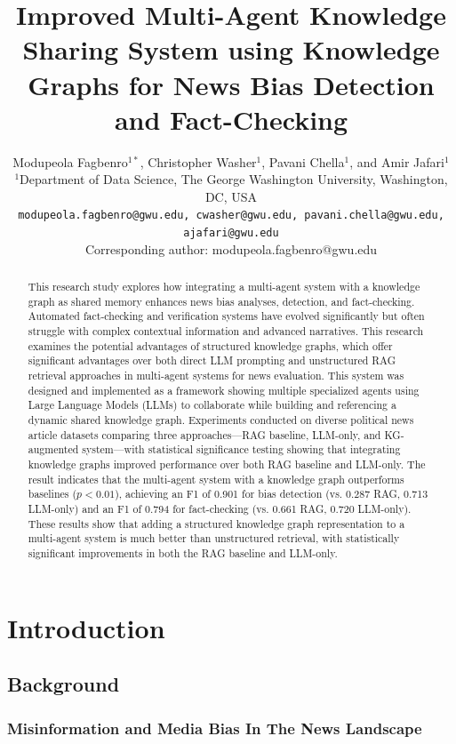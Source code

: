 \documentclass[11pt]{article}
\title{Improved Multi-Agent Knowledge Sharing System using Knowledge Graphs for News Bias Detection and Fact-Checking}
\author{Modupeola Fagbenro$^{1*}$, Christopher Washer$^{1}$, Pavani Chella$^{1}$, and Amir Jafari$^{1}$\\
\small $^{1}$Department of Data Science, The George Washington University, Washington, DC, USA\\
\small \texttt{modupeola.fagbenro@gwu.edu, cwasher@gwu.edu, pavani.chella@gwu.edu, ajafari@gwu.edu}\\
\small * Corresponding author: modupeola.fagbenro@gwu.edu
}
\date{} %
\begin{document}
\maketitle

\begin{abstract}

This research study explores how integrating a multi-agent system with a knowledge graph as shared memory enhances news bias analyses, detection, and fact-checking. Automated fact-checking and verification systems have evolved significantly but often struggle with complex contextual information and advanced narratives. This research examines the potential advantages of structured knowledge graphs, which offer significant advantages over both direct LLM prompting and unstructured RAG retrieval approaches in multi-agent systems for news evaluation.  This system was designed and implemented as a framework showing multiple specialized agents using Large Language Models (LLMs) to collaborate while building and referencing a dynamic shared knowledge graph. Experiments conducted on diverse political news article datasets comparing three approaches—RAG baseline, LLM-only, and KG-augmented system—with statistical significance testing showing that integrating knowledge graphs improved performance over both RAG baseline and LLM-only. The result indicates that the multi-agent system with a knowledge graph outperforms baselines ($p<0.01$), achieving an F1 of 0.901 for bias detection (vs. 0.287 RAG, 0.713 LLM-only) and an F1 of 0.794 for fact-checking (vs. 0.661 RAG, 0.720 LLM-only). These results show that adding a structured knowledge graph representation to a multi-agent system is much better than unstructured retrieval, with statistically significant improvements in both the RAG baseline and LLM-only. 


  
\end{abstract}

\section{Introduction}
\subsection{Background}

\subsubsection{\textbf{Misinformation and Media Bias In The News Landscape}}
\end{document}
